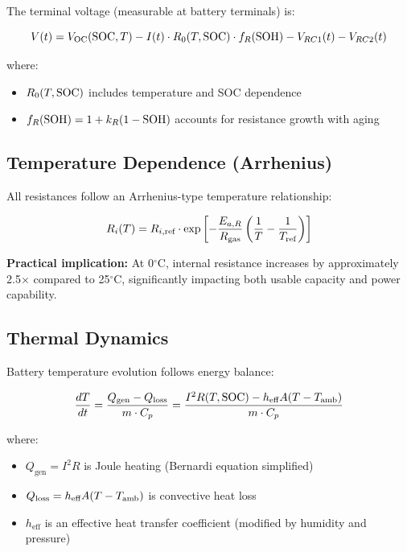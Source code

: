 The terminal voltage (measurable at battery terminals) is:

\begin{equation}
    V(t) = V_{\text{OC}}(\text{SOC}, T) - I(t) \cdot R_0(T, \text{SOC}) \cdot f_R(\text{SOH}) - V_{RC1}(t) - V_{RC2}(t)
    \label{eq:terminal_voltage}
\end{equation}

where:
\begin{itemize}
    \item $R_0(T, \text{SOC})$ includes temperature and SOC dependence
    \item $f_R(\text{SOH}) = 1 + k_R(1 - \text{SOH})$ accounts for resistance growth with aging
\end{itemize}

\subsection{Temperature Dependence (Arrhenius)}
\label{subsec:temperature}

All resistances follow an Arrhenius-type temperature relationship:

\begin{equation}
    R_i(T) = R_{i,\text{ref}} \cdot \exp\left[-\frac{E_{a,R}}{R_{\text{gas}}}\left(\frac{1}{T} - \frac{1}{T_{\text{ref}}}\right)\right]
    \label{eq:arrhenius}
\end{equation}

\textbf{Practical implication:} At 0$^\circ$C, internal resistance increases by approximately 2.5$\times$ compared to 25$^\circ$C, significantly impacting both usable capacity and power capability.

\subsection{Thermal Dynamics}
\label{subsec:thermal}

Battery temperature evolution follows energy balance:

\begin{equation}
    \frac{dT}{dt} = \frac{Q_{\text{gen}} - Q_{\text{loss}}}{m \cdot C_p} = \frac{I^2 R(T, \text{SOC}) - h_{\text{eff}} A (T - T_{\text{amb}})}{m \cdot C_p}
    \label{eq:thermal}
\end{equation}

where:
\begin{itemize}
    \item $Q_{\text{gen}} = I^2 R$ is Joule heating (Bernardi equation simplified)
    \item $Q_{\text{loss}} = h_{\text{eff}} A (T - T_{\text{amb}})$ is convective heat loss
    \item $h_{\text{eff}}$ is an effective heat transfer coefficient (modified by humidity and pressure)
\end{itemize}

